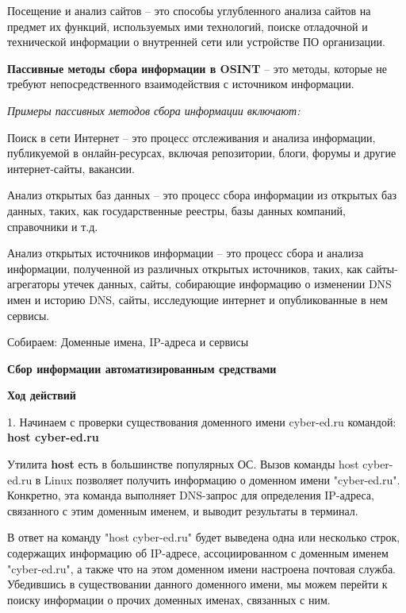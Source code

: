 	\par Посещение и анализ сайтов – это способы углубленного анализа сайтов на предмет их функций, используемых ими технологий, поиске отладочной и технической информации о внутренней сети или устройстве ПО организации.
	
	\par \textbf{Пассивные методы сбора информации в OSINT} – это методы, которые не требуют непосредственного взаимодействия с источником информации.
	
	\par \textit{Примеры пассивных методов сбора информации включают:}
	
	\par Поиск в сети Интернет – это процесс отслеживания и анализа информации, публикуемой в онлайн-ресурсах, включая репозитории, блоги, форумы и другие интернет-сайты, вакансии.
	
	\par Анализ открытых баз данных – это процесс сбора информации из открытых баз данных, таких, как государственные реестры, базы данных компаний, справочники и т.д.
	
	\par Анализ открытых источников информации – это процесс сбора и анализа информации, полученной из различных открытых источников, таких, как сайты-агрегаторы утечек данных, сайты, собирающие информацию о изменении DNS имен и историю DNS, сайты, исследующие интернет и опубликованные в нем сервисы.
	
	
	\par Собираем: Доменные имена, IP-адреса и сервисы 

	\par \textbf{Сбор информации автоматизированным средствами}
	
	\par \textbf{Ход действий}

	\par 1. Начинаем с проверки существования доменного имени cyber-ed.ru командой: \textbf{host cyber-ed.ru}
	
	\par Утилита \textbf{host} есть в большинстве популярных ОС. Вызов команды host cyber-ed.ru в Linux позволяет получить информацию о доменном имени "cyber-ed.ru". Конкретно, эта команда выполняет DNS-запрос для определения IP-адреса, связанного с этим доменным именем, и выводит результаты в терминал.
	
	\par В ответ на команду "host cyber-ed.ru" будет выведена одна или несколько строк, содержащих информацию об IP-адресе, ассоциированном с доменным именем "cyber-ed.ru", а также что на этом доменном имени настроена почтовая служба. Убедившись в существовании данного доменного имени, мы можем перейти к поиску информации о прочих доменных именах, связанных с ним.
	
